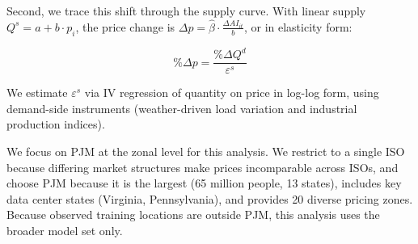 \documentclass[a4paper,fleqn,longmktitle]{cas-sc}
\begin{document}
Second, we trace this shift through the supply curve. With linear supply $Q^s=a+b\cdot p_i$, the price change is $\Delta p=\hat{\beta}\cdot \frac{\Delta AI_{it}}{b}$, or in elasticity form:

\begin{equation}
\% \Delta p = \frac{\% \Delta Q^d}{\varepsilon^s}
\label{eq:price-impact-elasticity}
\end{equation}

We estimate $\varepsilon^s$ via IV regression of quantity on price in log-log form, using demand-side instruments (weather-driven load variation and industrial production indices).

We focus on PJM at the zonal level for this analysis. We restrict to a single ISO because differing market structures make prices incomparable across ISOs, and choose PJM because it is the largest (65 million people, 13 states), includes key data center states (Virginia, Pennsylvania), and provides 20 diverse pricing zones. Because observed training locations are outside PJM, this analysis uses the broader model set only.
\end{document}
